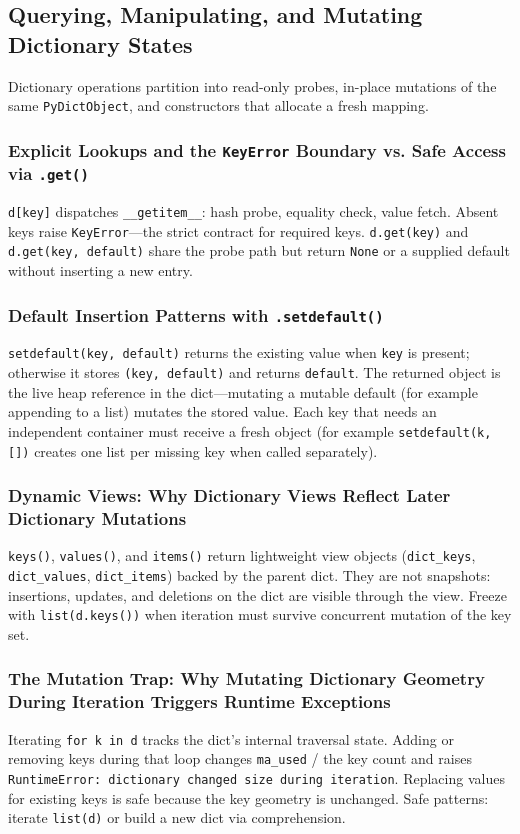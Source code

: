 \subsection{Querying, Manipulating, and Mutating Dictionary States}

Dictionary operations partition into read-only probes, in-place mutations of the same \texttt{PyDictObject}, and constructors that allocate a fresh mapping.

\subsubsection{Explicit Lookups and the \texttt{KeyError} Boundary vs. Safe Access via \texttt{.get()}}

\texttt{d[key]} dispatches \texttt{\_\_getitem\_\_}: hash probe, equality check, value fetch. Absent keys raise \texttt{KeyError}---the strict contract for required keys. \texttt{d.get(key)} and \texttt{d.get(key, default)} share the probe path but return \texttt{None} or a supplied default without inserting a new entry.

\subsubsection{Default Insertion Patterns with \texttt{.setdefault()}}

\texttt{setdefault(key, default)} returns the existing value when \texttt{key} is present; otherwise it stores \texttt{(key, default)} and returns \texttt{default}. The returned object is the live heap reference in the dict---mutating a mutable default (for example appending to a list) mutates the stored value. Each key that needs an independent container must receive a fresh object (for example \texttt{setdefault(k, [])} creates one list per missing key when called separately).

\subsubsection{Dynamic Views: Why Dictionary Views Reflect Later Dictionary Mutations}

\texttt{keys()}, \texttt{values()}, and \texttt{items()} return lightweight view objects (\texttt{dict\_keys}, \texttt{dict\_values}, \texttt{dict\_items}) backed by the parent dict. They are not snapshots: insertions, updates, and deletions on the dict are visible through the view. Freeze with \texttt{list(d.keys())} when iteration must survive concurrent mutation of the key set.

\subsubsection{The Mutation Trap: Why Mutating Dictionary Geometry During Iteration Triggers Runtime Exceptions}

Iterating \texttt{for k in d} tracks the dict's internal traversal state. Adding or removing keys during that loop changes \texttt{ma\_used} / the key count and raises \texttt{RuntimeError: dictionary changed size during iteration}. Replacing values for existing keys is safe because the key geometry is unchanged. Safe patterns: iterate \texttt{list(d)} or build a new dict via comprehension.
